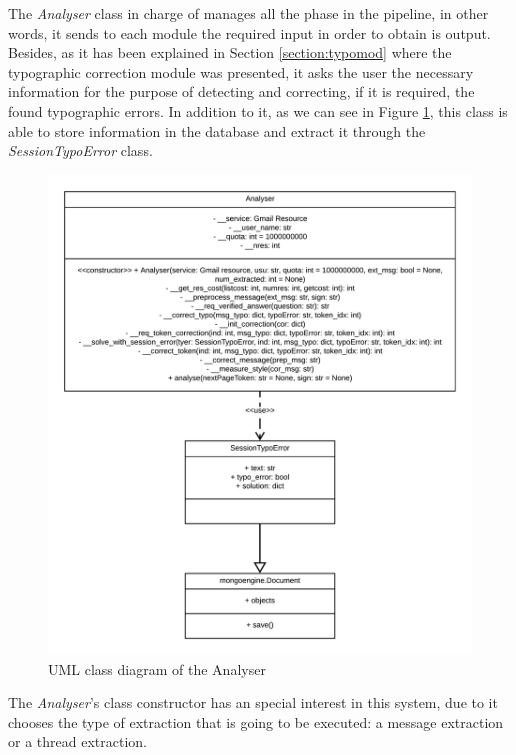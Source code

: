 The \textit{Analyser} class in charge of manages all the phase in the pipeline, in other words, it sends to each module the required input in order to obtain is output. Besides, as it has been explained in Section \ref{section:typomod} where the typographic correction module was presented, it asks the user the necessary information for the purpose of detecting and correcting, if it is required, the found typographic errors. In addition to it, as we can see in Figure \ref{fig:umlanalyser}, this class is able to store information in the database and extract it through the \textit{SessionTypoError} class.

\begin{figure}[h]
	\centering%
	\centerline{\includegraphics[width=0.6\paperwidth]{Imagenes/Bitmap/analyserUML.png}}%
	\caption{UML class diagram of the Analyser}%
	\label{fig:umlanalyser}
\end{figure}

The \textit{Analyser}'s class constructor has an special interest in this system, due to it chooses the type of extraction that is going to be executed: a message extraction or a thread extraction.
